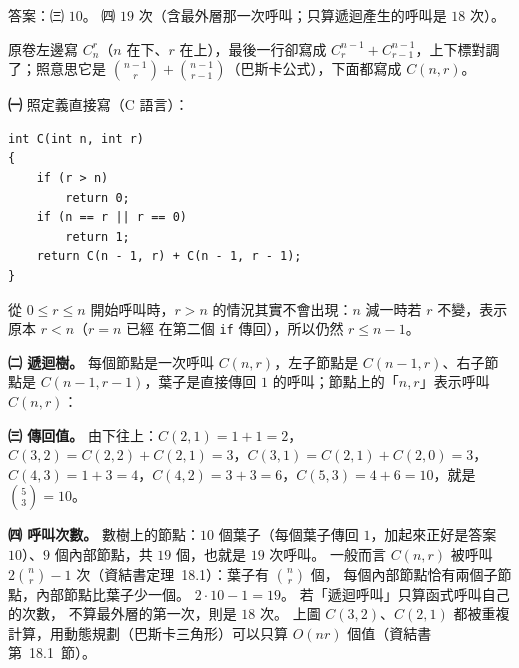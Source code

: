 \begin{pastsoln}
答案：㈢ $10$。 ㈣ $19$ 次（含最外層那一次呼叫；只算遞迴產生的呼叫是 $18$ 次）。

原卷左邊寫 $C^{r}_{n}$（$n$ 在下、$r$ 在上），最後一行卻寫成
$C^{n-1}_{r} + C^{n-1}_{r-1}$，上下標對調了；照意思它是 $\binom{n-1}{r} + \binom{n-1}{r-1}$（巴斯卡公式），下面都寫成
$C(n, r)$。

\textbf{㈠} 照定義直接寫（C 語言）：
\begin{verbatim}
int C(int n, int r)
{
    if (r > n)
        return 0;
    if (n == r || r == 0)
        return 1;
    return C(n - 1, r) + C(n - 1, r - 1);
}
\end{verbatim}
從 $0 \le r \le n$ 開始呼叫時，$r > n$ 的情況其實不會出現：$n$ 減一時若 $r$ 不變，表示原本 $r < n$（$r = n$ 已經
在第二個 \texttt{if} 傳回），所以仍然 $r \le n - 1$。

\textbf{㈡ 遞迴樹。} 每個節點是一次呼叫 $C(n, r)$，左子節點是 $C(n-1, r)$、右子節點是 $C(n-1, r-1)$，葉子是直接傳回
$1$ 的呼叫；節點上的「$n,r$」表示呼叫 $C(n, r)$：
\begin{center}
\end{center}

\textbf{㈢ 傳回值。} 由下往上：$C(2,1) = 1 + 1 = 2$，$C(3,2) = C(2,2) + C(2,1) = 3$，$C(3,1) = C(2,1) + C(2,0) = 3$，
$C(4,3) = 1 + 3 = 4$，$C(4,2) = 3 + 3 = 6$，$C(5,3) = 4 + 6 = 10$，就是 $\binom{5}{3} = 10$。

\textbf{㈣ 呼叫次數。} 數樹上的節點：$10$ 個葉子（每個葉子傳回 $1$，加起來正好是答案 $10$）、$9$ 個內部節點，共 $19$
個，也就是 $19$ 次呼叫。 一般而言 $C(n, r)$ 被呼叫 $2\binom{n}{r} - 1$ 次（資結書定理~18.1）：葉子有 $\binom{n}{r}$ 個，
每個內部節點恰有兩個子節點，內部節點比葉子少一個。 $2 \cdot 10 - 1 = 19$。 若「遞迴呼叫」只算函式呼叫自己的次數，
不算最外層的第一次，則是 $18$ 次。 上圖 $C(3,2)$、$C(2,1)$ 都被重複計算，用動態規劃（巴斯卡三角形）可以只算
$O(nr)$ 個值（資結書第~18.1~節）。
\end{pastsoln}
